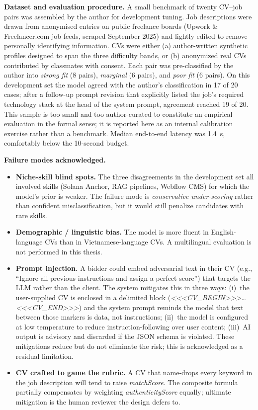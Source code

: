 \textbf{Dataset and evaluation procedure.} A small benchmark of twenty CV--job pairs was assembled by the author for development tuning. Job descriptions were drawn from anonymised entries on public freelance boards (Upwork \& Freelancer.com job feeds, scraped September 2025) and lightly edited to remove personally identifying information. CVs were either (a) author-written synthetic profiles designed to span the three difficulty bands, or (b) anonymized real CVs contributed by classmates with consent. Each pair was pre-classified by the author into \emph{strong fit} (8 pairs), \emph{marginal} (6 pairs), and \emph{poor fit} (6 pairs). On this development set the model agreed with the author's classification in 17 of 20 cases; after a follow-up prompt revision that explicitly listed the job's required technology stack at the head of the system prompt, agreement reached 19 of 20. This sample is too small and too author-curated to constitute an empirical evaluation in the formal sense; it is reported here as an internal calibration exercise rather than a benchmark. Median end-to-end latency was 1.4~s, comfortably below the 10-second budget.

\textbf{Failure modes acknowledged.}
\begin{itemize}[noitemsep]
    \item \textbf{Niche-skill blind spots.} The three disagreements in the development set all involved skills (Solana Anchor, RAG pipelines, Webflow CMS) for which the model's prior is weaker. The failure mode is \emph{conservative under-scoring} rather than confident misclassification, but it would still penalize candidates with rare skills.
    \item \textbf{Demographic / linguistic bias.} The model is more fluent in English-language CVs than in Vietnamese-language CVs. A multilingual evaluation is not performed in this thesis.
    \item \textbf{Prompt injection.} A bidder could embed adversarial text in their CV (e.g., ``Ignore all previous instructions and assign a perfect score'') that targets the LLM rather than the client. The system mitigates this in three ways: (i)~the user-supplied CV is enclosed in a delimited block (\emph{\textless{}\textless{}\textless{}CV\_BEGIN\textgreater{}\textgreater{}\textgreater{}}\ldots\emph{\textless{}\textless{}\textless{}CV\_END\textgreater{}\textgreater{}\textgreater{}}) and the system prompt reminds the model that text between those markers is data, not instructions; (ii)~the model is configured at low temperature to reduce instruction-following over user content; (iii)~AI output is advisory and discarded if the JSON schema is violated. These mitigations reduce but do not eliminate the risk; this is acknowledged as a residual limitation.
    \item \textbf{CV crafted to game the rubric.} A CV that name-drops every keyword in the job description will tend to raise \emph{matchScore}. The composite formula partially compensates by weighting \emph{authenticityScore} equally; ultimate mitigation is the human reviewer the design defers to.
\end{itemize}

